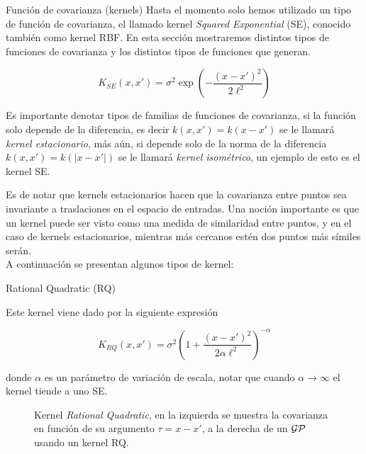 \documentclass[9pt]{beamer}
\begin{document}
\begin{frame}{Función de covarianza (kernels)}
    Hasta el momento solo hemos utilizado un tipo de función de covarianza, el llamado kernel \textit{Squared Exponential} (SE), conocido también como kernel RBF. En esta sección mostraremos distintos tipos de funciones de covarianza y los distintos tipos de funciones que generan. \pause 

    \begin{equation*}
	K_{SE}(x, x') = \sigma^2 \exp\left( - \frac{\left( x- x'\right)^2}{2\ell^2} \right)
    \end{equation*} \pause 

    Es importante denotar tipos de familias de funciones de covarianza, si la función solo depende de la diferencia, es decir $k(x, x')=k(x-x')$ se le llamará \textit{kernel estacionario}, más aún, si depende solo de la norma de la diferencia $k(x, x')=k(|x-x'|)$ se le llamará \textit{kernel isométrico}, un ejemplo de esto es el kernel SE. \pause \vspace{0.2cm}

    Es de notar que kernels estacionarios hacen que la covarianza entre puntos sea invariante a traslaciones en el espacio de entradas. Una noción importante es que un kernel puede ser visto como una medida de similaridad entre puntos, y en el caso de kernels estacionarios, mientras más cercanos estén dos puntos más símiles serán. \\

    A continuación se presentan algunos tipos de kernel:
    
\end{frame}

\begin{frame}{Rational Quadratic (RQ)}


    Este kernel viene dado por la siguiente expresión 
 
    \begin{equation*}\label{eq:gp_kernel_rq}
	K_{RQ}(x, x') = \sigma^2 \left(1 + \frac{\left( x- x'\right)^2}{2\alpha\ell^2 } \right)^{-\alpha}
    \end{equation*}

    donde $\alpha$ es un parámetro de variación de escala, notar que cuando $\alpha \rightarrow \infty$ el kernel tiende a uno SE. \pause

    \begin{figure}[H]
	    \centering
	    \caption{Kernel \textit{Rational Quadratic}, en la izquierda se muestra la covarianza en función de su argumento $\tau=x-x'$, a la derecha de un $\mathcal{GP}$ usando un kernel RQ.}
    \end{figure}

    
\end{frame}
\end{document}
